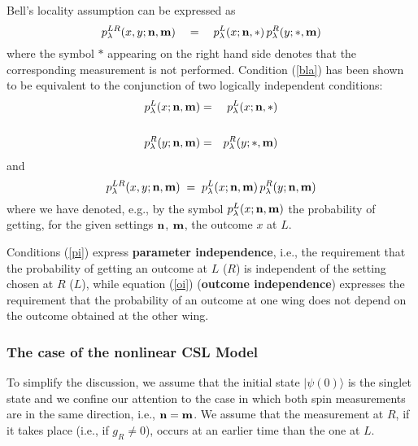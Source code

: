 \documentclass[12pt]{article}
\begin{document}
Bell's locality assumption can be expressed as
\begin{equation} \label{bla}
p^{LR}_{\lambda}(x,y;{\bf n}, {\bf m}) \quad = \quad
p^{L}_{\lambda}(x;{\bf n}, *)\, p^{R}_{\lambda}(y; *, {\bf m})
\end{equation}
where the symbol $*$ appearing on the right hand side denotes that
the corresponding measurement is not performed. Condition
(\ref{bla}) has been shown \cite{ja84,shi1} to be equivalent to
the conjunction of two logically independent conditions:
\begin{eqnarray} \label{pi}
p^{L}_{\lambda}(x;{\bf n}, {\bf m}) & = & p^{L}_{\lambda}(x;{\bf
n}, *)
\nonumber \\ & &  \\
p^{R}_{\lambda}(y;{\bf n}, {\bf m}) & = & p^{R}_{\lambda}(y; *,
{\bf m}) \nonumber
\end{eqnarray}
and
\begin{equation} \label{oi}
p^{LR}_{\lambda}(x,y;{\bf n}, {\bf m}) \; = \;
p^{L}_{\lambda}(x;{\bf n}, {\bf m})\, p^{R}_{\lambda}(y;{\bf n},
{\bf m})
\end{equation}
where we have denoted, e.g., by the symbol $p^{L}_{\lambda}(x;{\bf
n}, {\bf m})$ the probability of getting, for the given settings
${\bf n}$, ${\bf m}$, the outcome $x$ at $L$.

Conditions (\ref{pi}) express {\bf parameter independence}, i.e.,
the requirement that the probability of getting an outcome at $L$
($R$) is independent of the setting chosen at $R$ ($L$), while
equation (\ref{oi}) ({\bf outcome independence}) expresses the
requirement that the probability of an outcome at one wing does
not depend on the outcome obtained at the other wing.


\subsubsection{The case of the nonlinear CSL Model}
\label{sec1131}

To simplify the discussion, we assume that the initial state
$|\psi(0)\rangle$ is the singlet state and we confine our
attention to the case in which both spin measurements are in the
same direction, i.e., ${\bf n} = {\bf m}$. We assume that the
measurement at $R$, if it takes place (i.e., if $g_{R} \neq 0$),
occurs at an earlier time than the one at $L$.
\end{document}
